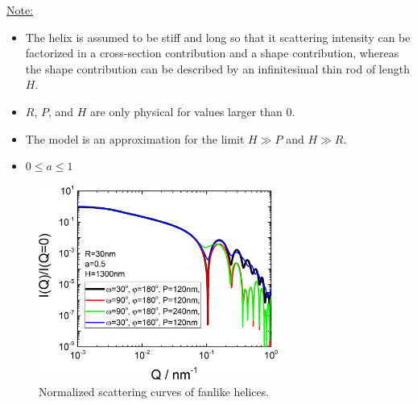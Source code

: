 \noindent\underline{Note:}
\begin{itemize}
\item The helix is assumed to be stiff and long so that it scattering intensity can be factorized in a cross-section contribution and a shape contribution, whereas the shape contribution can be described by an infinitesimal thin rod of length $H$.
\item $R$, $P$, and $H$ are only physical for values larger than 0.
\item The model is an approximation for the limit $H \gg P$ and $H \gg R$.
\item $0\leq a\leq 1$
\end{itemize}

\begin{figure}[htb]
\begin{center}
\includegraphics[width=0.7\textwidth]{../images/form_factor/cylindrical_obj/helix_fanlike_IQ.png}
\end{center}
\caption{Normalized scattering curves of fanlike helices.}
\label{fig:helixfanlikeIQ}
\end{figure}

\newpage
